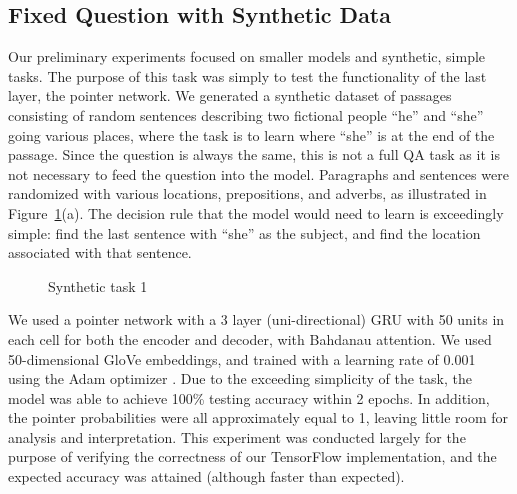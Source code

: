 \documentclass{article}
\begin{document}
\subsection{Fixed Question with Synthetic Data}
Our preliminary experiments focused on smaller models and synthetic, simple tasks. The purpose of this task was simply to test the functionality of the last layer, the pointer network. We generated a synthetic dataset of passages consisting of random sentences describing two fictional people ``he'' and ``she'' going various places, where the task is to learn where ``she'' is at the end of the passage. Since the question is always the same, this is not a full QA task as it is not necessary to feed the question into the model. Paragraphs and sentences were randomized with various locations, prepositions, and adverbs, as illustrated in Figure~\ref{fig:fakeData1}(a). The decision rule that the model would need to learn is exceedingly simple: find the last sentence with ``she'' as the subject, and find the location associated with that sentence.

\begin{figure}[h]
	\centering
	\qquad
	\caption{Synthetic task 1}
	\label{fig:fakeData1}
\end{figure}

We used a pointer network with a 3 layer (uni-directional) GRU with 50 units in each cell for both the encoder and decoder, with Bahdanau attention. We used 50-dimensional GloVe embeddings, and trained with a learning rate of 0.001 using the Adam optimizer \cite{Adam}. Due to the exceeding simplicity of the task, the model was able to achieve 100\% testing accuracy within 2 epochs. In addition, the pointer probabilities were all approximately equal to 1, leaving little room for analysis and interpretation. This experiment was conducted largely for the purpose of verifying the correctness of our TensorFlow implementation, and the expected accuracy was attained (although faster than expected).  
\end{document}
